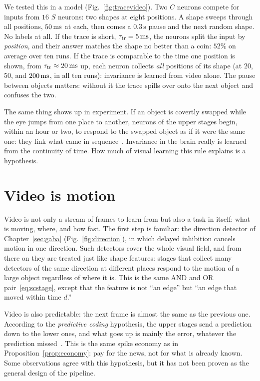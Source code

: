 We tested this in a model (Fig.~\ref{fig:tracevideo}). Two $C$ neurons compete for inputs from $16$ $S$ neurons: two shapes at eight positions. A shape sweeps through all positions, $50\,\text{ms}$ at each, then comes a $0.3\,\text{s}$ pause and the next random shape. No labels at all. If the trace is short, $\tau_{\text{tr}}=5\,\text{ms}$, the neurons split the input by \emph{position}, and their answer matches the shape no better than a coin: $52\%$ on average over ten runs. If the trace is comparable to the time one position is shown, from $\tau_{\text{tr}}\approx20\,\text{ms}$ up, each neuron collects \emph{all} positions of its shape (at $20$, $50$, and $200\,\text{ms}$, in all ten runs): invariance is learned from video alone. The pause between objects matters: without it the trace spills over onto the next object and confuses the two.

The same thing shows up in experiment. If an object is covertly swapped while the eye jumps from one place to another, neurons of the upper stages begin, within an hour or two, to respond to the swapped object as if it were the same one: they link what came in sequence~\cite{LiDiCarlo2008}. Invariance in the brain really is learned from the continuity of time. How much of visual learning this rule explains is a hypothesis.

\section{Video is motion}

Video is not only a stream of frames to learn from but also a task in itself: what is moving, where, and how fast. The first step is familiar: the direction detector of Chapter~\ref{sec:gaba} (Fig.~\ref{fig:direction}), in which delayed inhibition cancels motion in one direction. Such detectors cover the whole visual field, and from there on they are treated just like shape features: stages that collect many detectors of the same direction at different places respond to the motion of a large object regardless of where it is. This is the same AND and OR pair~\eqref{eq:scstage}, except that the feature is not ``an edge'' but ``an edge that moved within time $d$.''

Video is also predictable: the next frame is almost the same as the previous one. According to the \emph{predictive coding} hypothesis, the upper stages send a prediction down to the lower ones, and what goes up is mainly the error, whatever the prediction missed~\cite{RaoBallard1999}. This is the same spike economy as in Proposition~\ref{prop:economy}: pay for the news, not for what is already known. Some observations agree with this hypothesis, but it has not been proven as the general design of the pipeline.

